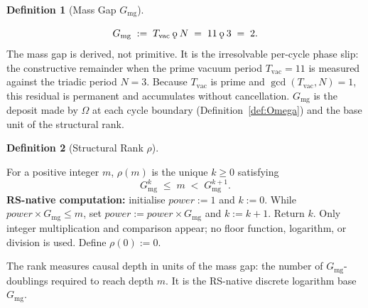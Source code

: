 \documentclass[11pt, letterpaper]{article}
\newcommand{\rank}{\rho}
\newcommand{\koppa}{\mathbin{\text{\rm\k{o}}}}
\theoremstyle{definition}
\newtheorem{definition}{Definition}[section]
\theoremstyle{plain}
\begin{document}
\begin{definition}[Mass Gap $G_{\mathrm{mg}}$]\label{def:Gmg}
\begin{rsbox}
\[
G_{\mathrm{mg}} \;:=\; T_{\mathrm{vac}} \koppa N \;=\; 11 \koppa 3 \;=\; 2.
\]
The mass gap is derived, not primitive.  It is the irresolvable per-cycle
phase slip: the constructive remainder when the prime vacuum period
$T_{\mathrm{vac}}=11$ is measured against the triadic period $N=3$.
Because $T_{\mathrm{vac}}$ is prime and $\gcd(T_{\mathrm{vac}},N)=1$, this
residual is permanent and accumulates without cancellation.  $G_{\mathrm{mg}}$
is the deposit made by $\Omega$ at each cycle boundary
(Definition~\ref{def:Omega}) and the base unit of the structural rank.
\end{rsbox}
\end{definition}

\begin{definition}[Structural Rank $\rank$]\label{def:rank}
\begin{rsbox}
For a positive integer $m$, $\rank(m)$ is the unique $k\geq 0$ satisfying
\[
G_{\mathrm{mg}}^k \;\leq\; m \;<\; G_{\mathrm{mg}}^{k+1}.
\]
\textbf{RS-native computation:} initialise $\mathit{power}:=1$ and
$k:=0$.  While $\mathit{power}\times G_{\mathrm{mg}}\leq m$, set
$\mathit{power}:=\mathit{power}\times G_{\mathrm{mg}}$ and
$k:=k+1$.  Return $k$.  Only integer multiplication and comparison appear;
no floor function, logarithm, or division is used.  Define $\rank(0):=0$.

The rank measures causal depth in units of the mass gap: the number of
$G_{\mathrm{mg}}$-doublings required to reach depth $m$.  It is the
RS-native discrete logarithm base $G_{\mathrm{mg}}$.
\end{rsbox}
\end{definition}
\end{document}
